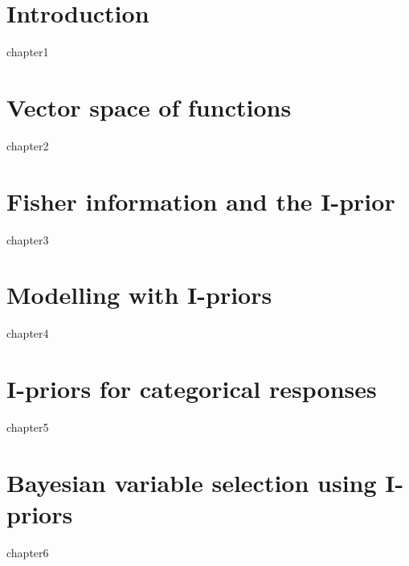 \documentclass[a4paper,showframe,11pt]{report}
\begin{document}
\hTOCandLists
\clearpage


\chapter{Introduction} 
{chapter1}

\chapter{Vector space of functions}
{chapter2}

\chapter{Fisher information and the I-prior}
{chapter3}

\chapter{Modelling with I-priors}
{chapter4}

\chapter{I-priors for categorical responses}
{chapter5}

\chapter{Bayesian variable selection using I-priors}
{chapter6}

%

\hPrintBibliography
\end{document}

